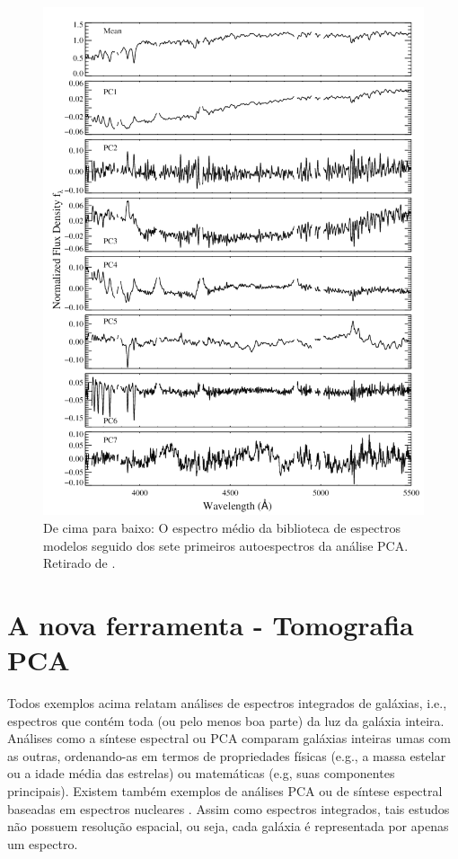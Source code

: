 \begin{figure}
    \includegraphics[height=1.\textwidth]{figuras/figChen2012fig2.pdf}
    \caption[Espectro médio e 7 primeiras PCs de uma biblioteca de modelos.]
    {De cima para baixo: O espectro médio da biblioteca de espectros modelos seguido dos sete primeiros autoespectros
    da análise PCA. Retirado de \citet{Chen2012}.}
    \label{fig:Chen2012fig2}
\end{figure}

\section{A nova ferramenta - Tomografia PCA}
\label{sec:Intro:TomoPCA}

Todos exemplos acima relatam análises de espectros integrados de galáxias, i.e., espectros que contém toda (ou pelo
menos boa parte) da luz da galáxia inteira. Análises como a síntese espectral ou PCA comparam galáxias inteiras umas com as
outras, ordenando-as em termos de propriedades físicas (e.g., a massa estelar ou a idade média das estrelas) ou
matemáticas (e.g, suas componentes principais). Existem também exemplos de análises PCA ou de síntese espectral baseadas
em espectros nucleares \citep[e.g., ][]{Trager2000I, CidFernandes2004}. Assim como espectros integrados, tais estudos
não possuem resolução espacial, ou seja, cada galáxia é representada por apenas um espectro.

